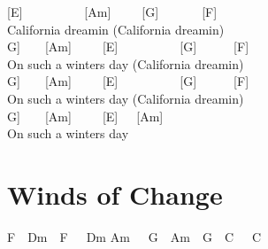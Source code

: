 \documentclass[
  letterpaper,
]{scrbook}
\begin{document}
{[}E{]}~~~~~~~~~~{[}Am{]}~~~~~{[}G{]}~~~~~~~{[}F{]}\\
California dreamin (California dreamin\textquotesingle)\\
\hspace*{0.333em}\hspace*{0.333em}{[}G{]}~~~~{[}Am{]}~~~~~{[}E{]}~~~~~~~~~~{[}G{]}~~~~~~{[}F{]}\\
On such a winter\textquotesingle s day (California
dreamin\textquotesingle)\\
\hspace*{0.333em}\hspace*{0.333em}{[}G{]}~~~~{[}Am{]}~~~~~{[}E{]}~~~~~~~~~~{[}G{]}~~~~~~{[}F{]}\\
On such a winter\textquotesingle s day (California
dreamin\textquotesingle)\\
\hspace*{0.333em}\hspace*{0.333em}{[}G{]}~~~~{[}Am{]}~~~~~{[}E{]}~~~{[}Am{]}\\
On such a winter\textquotesingle s day

\hypertarget{winds-of-change}{%
\chapter{Winds of Change}\label{winds-of-change}}

F~~Dm~~F~~~Dm Am~~~G~~Am~~G~~C~~~C
\end{document}
